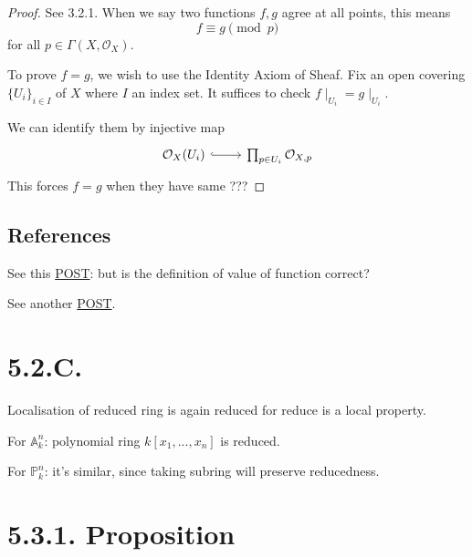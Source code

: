 \begin{proof}
    
See 3.2.1. When we say two functions $f,g$ agree at all points, this means 
\[f\equiv g\pmod{p}\] for all $p\in \Gamma(X,\mathcal O_X)$.    

To prove $f=g$, we wish to use the Identity Axiom of Sheaf. Fix an open covering $\{U_i\}_{i\in I}$ of $X$ where $I$ an index set. It suffices to check $f\mid_{U_i}=g\mid_{U_i}$.

We can identify them by injective map 
\[\begin{tikzcd}
	{\mathcal O_X(U_i)} & {\prod_{p\in U_i}\mathcal O_{X,p}}
	\arrow[hook, from=1-1, to=1-2]
\end{tikzcd}\]
This forces $f=g$ when they have same ???

\end{proof}

\subsection{References}

See this \href{https://math.stackexchange.com/questions/3834821/equality-of-functions-in-a-reduced-scheme}{POST}: but is the definition of value of function correct?

See another \href{https://math.stackexchange.com/questions/1157904/functions-on-reduced-schemes-are-determined-by-their-values-at-each-point}{POST}.

\section{5.2.C.}

Localisation of reduced ring is again reduced for reduce is a local property. 

For $\mathbb A^n_k$: 
polynomial ring $k[x_1,...,x_n]$ is reduced.

For $\mathbb P^n_k$: it's similar, since taking subring will preserve reducedness.

\section{5.3.1. Proposition}

